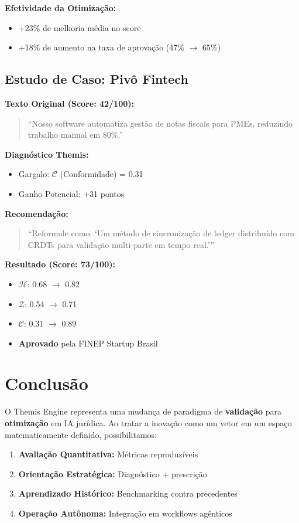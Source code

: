 \documentclass[12pt,a4paper]{article}
\begin{document}
\textbf{Efetividade da Otimização:}
\begin{itemize}
    \item +23\% de melhoria média no score
    \item +18\% de aumento na taxa de aprovação (47\% $\to$ 65\%)
\end{itemize}

\subsection{Estudo de Caso: Pivô Fintech}

\textbf{Texto Original (Score: 42/100):}
\begin{quote}
``Nosso software automatiza gestão de notas fiscais para PMEs, reduzindo trabalho manual em 80\%.''
\end{quote}

\textbf{Diagnóstico Themis:}
\begin{itemize}
    \item Gargalo: $\mathcal{C}$ (Conformidade) = 0.31
    \item Ganho Potencial: +31 pontos
\end{itemize}

\textbf{Recomendação:}
\begin{quote}
``Reformule como: `Um método de sincronização de ledger distribuído com CRDTs para validação multi-parte em tempo real.'''
\end{quote}

\textbf{Resultado (Score: 73/100):}
\begin{itemize}
    \item $\mathcal{H}$: 0.68 $\to$ 0.82
    \item $\mathcal{Z}$: 0.54 $\to$ 0.71
    \item $\mathcal{C}$: 0.31 $\to$ 0.89
    \item \textbf{Aprovado} pela FINEP Startup Brasil
\end{itemize}

\section{Conclusão}

O Themis Engine representa uma mudança de paradigma de \textbf{validação} para \textbf{otimização} em IA jurídica. Ao tratar a inovação como um vetor em um espaço matematicamente definido, possibilitamos:

\begin{enumerate}
    \item \textbf{Avaliação Quantitativa:} Métricas reproduzíveis
    \item \textbf{Orientação Estratégica:} Diagnóstico + prescrição
    \item \textbf{Aprendizado Histórico:} Benchmarking contra precedentes
    \item \textbf{Operação Autônoma:} Integração em workflows agênticos
\end{enumerate}
\end{document}
